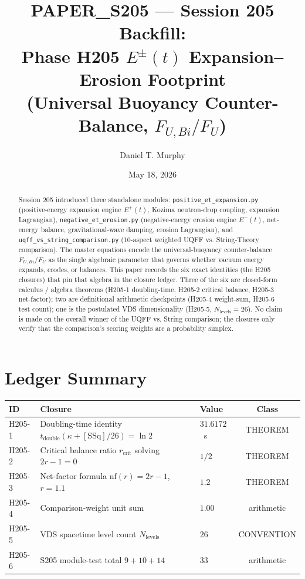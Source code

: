 \documentclass[11pt,letterpaper]{article}
\title{PAPER\_S205 --- Session 205 Backfill: \\
       Phase H205 $E^{\pm}(t)$ Expansion--Erosion Footprint \\
       (Universal Buoyancy Counter-Balance, $F_{U,Bi}/F_U$)}
\author{Daniel T. Murphy}
\date{May 18, 2026}
\theoremstyle{definition}
\begin{document}
\maketitle

\begin{abstract}
Session 205 introduced three standalone modules: \texttt{positive\_et\_expansion.py}
(positive-energy expansion engine $E^{+}(t)$, Kozima neutron-drop coupling,
expansion Lagrangian), \texttt{negative\_et\_erosion.py} (negative-energy
erosion engine $E^{-}(t)$, net-energy balance, gravitational-wave damping,
erosion Lagrangian), and \texttt{uqff\_vs\_string\_comparison.py} (10-aspect
weighted UQFF vs. String-Theory comparison). The master equations encode the
universal-buoyancy counter-balance $F_{U,Bi}/F_U$ as the single algebraic
parameter that governs whether vacuum energy expands, erodes, or balances.
This paper records the six exact identities (the H205 closures) that pin
that algebra in the closure ledger. Three of the six are closed-form
calculus / algebra theorems (H205-1 doubling-time, H205-2 critical balance,
H205-3 net-factor); two are definitional arithmetic checkpoints (H205-4
weight-sum, H205-6 test count); one is the postulated VDS dimensionality
(H205-5, $N_{\text{levels}}=26$). No claim is made on the overall winner of
the UQFF vs. String comparison; the closures only verify that the
comparison's scoring weights are a probability simplex.
\end{abstract}

\section{Ledger Summary}

\begin{center}
\begin{tabular}{lllc}
\toprule
ID & Closure & Value & Class \\
\midrule
H205-1 & Doubling-time identity $t_{\text{double}}(\kappa + [\mathrm{SSq}]/26) = \ln 2$ & $31.6172$~s & THEOREM \\
H205-2 & Critical balance ratio $r_{\text{crit}}$ solving $2r-1=0$ & $1/2$ & THEOREM \\
H205-3 & Net-factor formula $\text{nf}(r) = 2r - 1$, $r=1.1$ & $1.2$ & THEOREM \\
H205-4 & Comparison-weight unit sum & $1.00$ & arithmetic \\
H205-5 & VDS spacetime level count $N_{\text{levels}}$ & $26$ & CONVENTION \\
H205-6 & S205 module-test total $9+10+14$ & $33$ & arithmetic \\
\bottomrule
\end{tabular}
\end{center}
\end{document}

